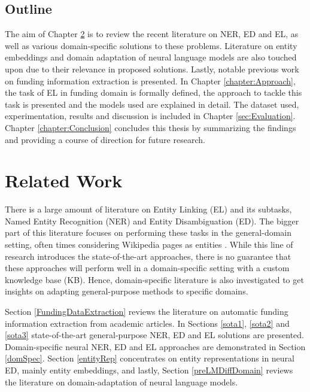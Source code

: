 \documentclass{report}
\theoremstyle{definition}
\theoremstyle{remark}
\begin{document}
\section{Outline}
The aim of Chapter \ref{chap:rw} is to review the recent literature on NER, ED and EL, as well as various domain-specific solutions to these problems. Literature on entity embeddings and domain adaptation of neural language models are also touched upon due to their relevance in proposed solutions. Lastly, notable previous work on funding information extraction is presented. In Chapter \ref{chapter:Approach}, the task of EL in funding domain is formally defined, the approach to tackle this task is presented and the models used are explained in detail. The dataset used, experimentation, results and discussion is included in Chapter \ref{sec:Evaluation}. Chapter \ref{chapter:Conclusion} concludes this thesis by summarizing the findings and providing a course of direction for future research.

\chapter{Related Work}
\label{chap:rw}
There is a large amount of literature on Entity Linking (EL) and its subtasks, Named Entity Recognition (NER) and Entity Disambiguation (ED). The bigger part of this literature focuses on performing these tasks in the general-domain setting, often times considering Wikipedia pages as entities \cite{nlpnotes}. While this line of research introduces the state-of-the-art approaches, there is no guarantee that these approaches will perform well in a domain-specific setting with a custom knowledge base (KB). Hence, domain-specific literature is also investigated to get insights on adapting general-purpose methods to specific domains.

Section \ref{FundingDataExtraction} reviews the literature on automatic funding information extraction from academic articles. In Sections \ref{sota1}, \ref{sota2} and \ref{sota3} state-of-the-art general-purpose NER, ED and EL solutions are presented. Domain-specific neural NER, ED and EL approaches are demonstrated in Section \ref{domSpec}. Section \ref{entityRep} concentrates on entity representations in neural ED, mainly entity embeddings, and lastly, Section \ref{preLMDiffDomain} reviews the literature on domain-adaptation of neural language models.
\end{document}
